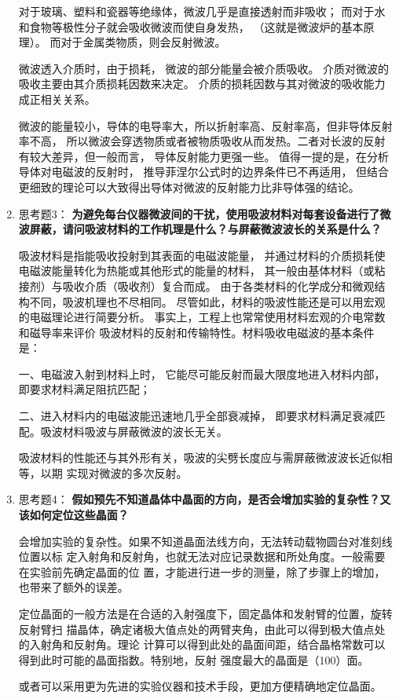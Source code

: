 \documentclass[11pt]{article}
\begin{document}
\begin{enumerate}
对于玻璃、塑料和瓷器等绝缘体，微波几乎是直接透射而非吸收；
而对于水和食物等极性分子就会吸收微波而使自身发热，
（这就是微波炉的基本原理）。
而对于金属类物质，则会反射微波。

微波透入介质时，由于损耗，
微波的部分能量会被介质吸收。
介质对微波的吸收主要由其介质损耗因数来决定。
介质的损耗因数与其对微波的吸收能力成正相关关系。

微波的能量较小，导体的电导率大，所以折射率高、反射率高，但非导体反射率不高，
所以微波会穿透物质或者被物质吸收从而发热。二者对长波的反射有较大差异，但一般而言，
导体反射能力更强一些。
值得一提的是，在分析导体对电磁波的反射时，
推导菲涅尔公式时的边界条件已不再适用，
但结合更细致的理论可以大致得出导体对微波的反射能力比非导体强的结论。

    \item 思考题3：  \textbf{为避免每台仪器微波间的干扰，使用吸波材料对每套设备进行了微波屏蔽，请问吸波材料的工作机理是什么？与屏蔽微波波长的关系是什么？}

吸波材料是指能吸收投射到其表面的电磁波能量，
并通过材料的介质损耗使电磁波能量转化为热能或其他形式的能量的材料，
其一般由基体材料（或粘接剂）与吸收介质（吸收剂）复合而成。
由于各类材料的化学成分和微观结构不同，吸波机理也不尽相同。
尽管如此，材料的吸波性能还是可以用宏观的电磁理论进行简要分析。
事实上，工程上也常常使用材料宏观的介电常数和磁导率来评价
吸波材料的反射和传输特性。材料吸收电磁波的基本条件是：

一、电磁波入射到材料上时，
它能尽可能反射而最大限度地进入材料内部，即要求材料满足阻抗匹配；

二、进入材料内的电磁波能迅速地几乎全部衰减掉，
即要求材料满足衰减匹配。吸波材料吸波与屏蔽微波的波长无关。

吸波材料的性能还与其外形有关，吸波的尖劈长度应与需屏蔽微波波长近似相等，以期
实现对微波的多次反射。

    \item 思考题4：  \textbf{假如预先不知道晶体中晶面的方向，是否会增加实验的复杂性？又该如何定位这些晶面？}

会增加实验的复杂性。如果不知道晶面法线方向，无法转动载物圆台对准刻线位置以标
定入射角和反射角，也就无法对应记录数据和所处角度。一般需要在实验前先确定晶面的位
置，才能进行进一步的测量，除了步骤上的增加，也带来了额外的误差。

定位晶面的一般方法是在合适的入射强度下，固定晶体和发射臂的位置，旋转反射臂扫
描晶体，确定诸极大值点处的两臂夹角，由此可以得到极大值点处的入射角和反射角。理论
计算可以得到此处的晶面间距，结合晶格常数可以得到此时可能的晶面指数。特别地，反射
强度最大的晶面是（100）面。

或者可以采用更为先进的实验仪器和技术手段，更加方便精确地定位晶面。

\end{enumerate}
\end{document}
